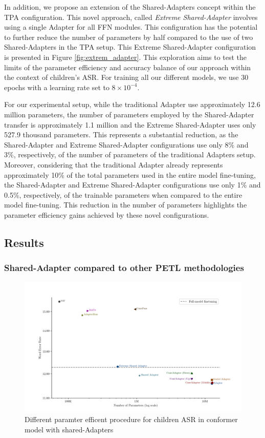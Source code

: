In addition, we propose an extension of the Shared-Adapters concept within the \ac{TPA} configuration. This novel approach, called \textit{Extreme Shared-Adapter} involves using a single Adapter for all \ac{FFN} modules. This configuration has the potential to further reduce the number of parameters by half compared to the use of two Shared-Adapters in the \ac{TPA} setup. This Extreme Shared-Adapter configuration is presented in Figure \ref{fig:extrem_adapter}. This exploration aims to test the limits of the parameter efficiency and accuracy balance of our approach within the context of children's ASR. For training all our different models, we use 30 epochs with a learning rate set to $8 \times 10^{-4}$.

For our experimental setup, while the traditional Adapter use approximately 12.6 million parameters, the number of parameters employed by the Shared-Adapter transfer is approximately 1.1 million and  the Extreme Shared-Adapter uses only 527.9 thousand parameters. This represents a substantial reduction, as the Shared-Adapter and Extreme Shared-Adapter configurations use only 8\% and 3\%, respectively, of the number of parameters of the traditional Adapters setup. Moreover, considering that the traditional Adapter already represents approximately 10\% of the total parameters used in the entire model fine-tuning, the Shared-Adapter and Extreme Shared-Adapter configurations use only 1\% and 0.5\%, respectively, of the trainable parameters when compared to the entire model fine-tuning. This reduction in the number of parameters highlights the parameter efficiency gains achieved by these novel configurations.

\subsection{Results}
\subsubsection{Shared-Adapter compared to other PETL methodologies}
\begin{figure}[t]
    \begin{center}
        \includegraphics[width=\textwidth]{imgs/Adapters_compare.png}
        \caption{Different paramter efficent procedure for children ASR in conformer model with shared-Adapters}
        \label{fig:adapter_compared}
    \end{center}
\end{figure}


